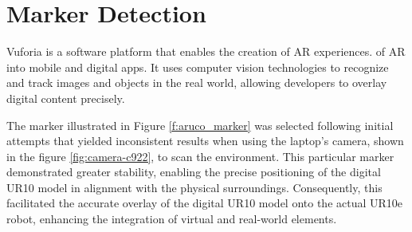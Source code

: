 

\section{Marker Detection}
\label{section:marker-detection}


    Vuforia is a software platform that enables the creation of \ac{AR} experiences. 
    of AR into mobile and digital apps. 
    It uses computer vision technologies to recognize and track images and objects in the real world, allowing developers to overlay digital 
    content precisely.

    The marker illustrated in Figure \ref{f:aruco_marker} was selected following initial attempts that yielded inconsistent results when using 
    the laptop's camera, shown in the figure \ref{fig:camera-c922}, to scan the environment. This particular marker demonstrated greater stability, 
    enabling the precise positioning of the digital UR10 model in alignment with the physical surroundings. Consequently, this facilitated the accurate 
    overlay of the digital UR10 model onto the actual UR10e robot, enhancing the integration of virtual and real-world elements.

